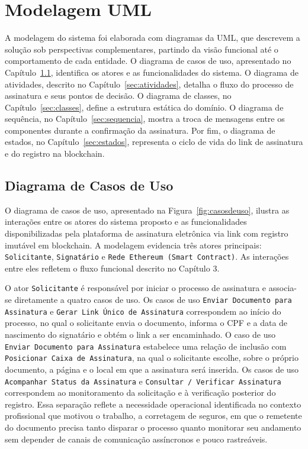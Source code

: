 \documentclass[
    12pt,
    a4paper,
    oneside,
    chapter=TITLE,
    section=TITLE,
    subsection=TITLE,
    subsubsection=TITLE,
    sumario=tradicional,
    english,
    brazil
]{abntex2}
\newcommand{\elem}[1]{\texttt{#1}}
\begin{document}
\section{Modelagem UML}
\label{sec:uml}

A modelagem do sistema foi elaborada com diagramas da UML, que
descrevem a solução sob perspectivas complementares, partindo da visão
funcional até o comportamento de cada entidade. O diagrama de casos de
uso, apresentado no Capítulo~\ref{sec:casos-uso}, identifica os atores
e as funcionalidades do sistema. O diagrama de atividades, descrito no
Capítulo~\ref{sec:atividades}, detalha o fluxo do processo de
assinatura e seus pontos de decisão. O diagrama de classes, no
Capítulo~\ref{sec:classes}, define a estrutura estática do domínio. O
diagrama de sequência, no Capítulo~\ref{sec:sequencia}, mostra a troca
de mensagens entre os componentes durante a confirmação da assinatura.
Por fim, o diagrama de estados, no Capítulo~\ref{sec:estados},
representa o ciclo de vida do link de assinatura e do registro na
blockchain.

\subsection{Diagrama de Casos de Uso}
\label{sec:casos-uso}

O diagrama de casos de uso, apresentado na Figura~\ref{fig:casosdeuso}, ilustra as interações entre os atores do sistema proposto e as funcionalidades disponibilizadas pela plataforma de assinatura eletrônica via link com registro imutável em blockchain. A modelagem evidencia três atores principais: \elem{Solicitante}, \elem{Signatário} e \elem{Rede Ethereum (Smart Contract)}. As interações entre eles refletem o fluxo funcional descrito no Capítulo 3.

O ator \elem{Solicitante} é responsável por iniciar o processo de assinatura e associa-se diretamente a quatro casos de uso. Os casos de uso \elem{Enviar Documento para Assinatura} e \elem{Gerar Link Único de Assinatura} correspondem ao início do processo, no qual o solicitante envia o documento, informa o CPF e a data de nascimento do signatário e obtém o link a ser encaminhado. O caso de uso \elem{Enviar Documento para Assinatura} estabelece uma relação de inclusão com \elem{Posicionar Caixa de Assinatura}, na qual o solicitante escolhe, sobre o próprio documento, a página e o local em que a assinatura será inserida. Os casos de uso \elem{Acompanhar Status da Assinatura} e \elem{Consultar / Verificar Assinatura} correspondem ao monitoramento da solicitação e à verificação posterior do registro. Essa separação reflete a necessidade operacional identificada no contexto profissional que motivou o trabalho, a corretagem de seguros, em que o remetente do documento precisa tanto disparar o processo quanto monitorar seu andamento sem depender de canais de comunicação assíncronos e pouco rastreáveis.
\end{document}
